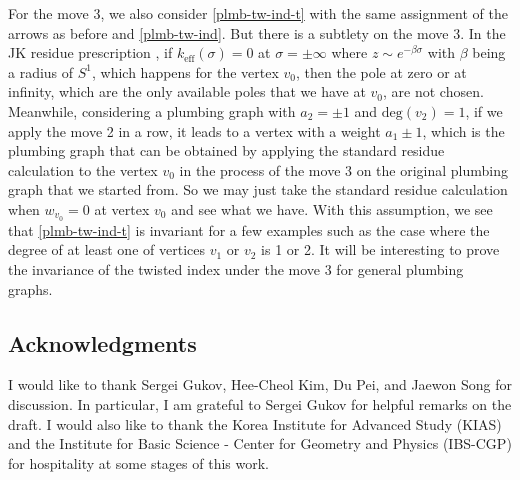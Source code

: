 \documentclass[11pt,hyper,a4paper]{article}
\begin{document}
For the move 3, we also consider \eqref{plmb-tw-ind-t} with the same assignment of the arrows as before and \eqref{plmb-tw-ind}.
But there is a subtlety on the move 3.
In the JK residue prescription \cite{Benini-Zaffaroni}, if $k_\text{eff}(\sigma)=0$ at $\sigma = \pm \infty$ where $z \sim e^{-\beta \sigma}$ with $\beta$ being a radius of $S^1$, which happens for the vertex $v_0$, then the pole at zero or at infinity, which are the only available poles that we have at $v_0$, are not chosen.
Meanwhile, considering a plumbing graph with $a_2=\pm 1$ and $\text{deg}(v_2)=1$, if we apply the move 2 in a row, it leads to a vertex with a weight $a_1 \pm 1$, which is the plumbing graph that can be obtained by applying the standard residue calculation to the vertex $v_0$ in the process of the move 3 on the original plumbing graph that we started from.
So we may just take the standard residue calculation when $w_{v_0}=0$ at vertex $v_0$ and see what we have.
With this assumption, we see that \eqref{plmb-tw-ind-t} is invariant for a few examples such as the case where the degree of at least one of vertices $v_1$ or $v_2$ is 1 or 2.
It will be interesting to prove the invariance of the twisted index under the move 3 for general plumbing graphs.








\subsection*{Acknowledgments}
I would like to thank Sergei Gukov, Hee-Cheol Kim, Du Pei, and Jaewon Song for discussion.
In particular, I am grateful to Sergei Gukov for helpful remarks on the draft.
I would also like to thank the Korea Institute for Advanced Study (KIAS) and the Institute for Basic Science - Center for Geometry and Physics (IBS-CGP) for hospitality at some stages of this work.






\end{document}
